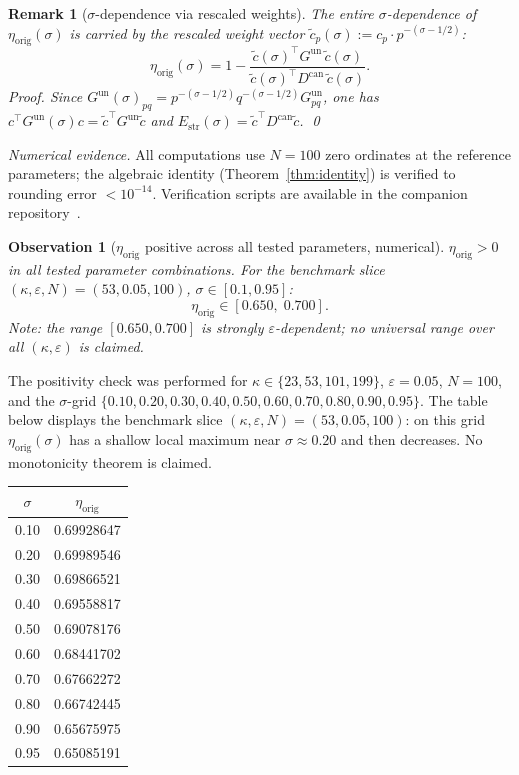 \documentclass[11pt]{article}
\newtheorem{observation}[theorem]{Observation}
\newtheorem*{remark}{Remark}
\newcommand{\Estr}{E_{\mathrm{str}}}
\newcommand{\etaorig}{\eta_{\mathrm{orig}}}
\newcommand{\Gun}{G^{\mathrm{un}}}
\newcommand{\Dcan}{D^{\mathrm{can}}}
\begin{document}
\begin{remark}[$\sigma$-dependence via rescaled weights]
The entire $\sigma$-dependence of $\etaorig(\sigma)$ is carried by the
rescaled weight vector $\tilde{c}_p(\sigma):=c_p\cdot p^{-(\sigma-1/2)}$:
\[
\etaorig(\sigma)=1-\frac{\tilde{c}(\sigma)^\top\Gun\,\tilde{c}(\sigma)}
{\tilde{c}(\sigma)^\top\Dcan\,\tilde{c}(\sigma)}.
\]
\emph{Proof.} Since $\Gun(\sigma)_{pq}=p^{-(\sigma-1/2)}q^{-(\sigma-1/2)}\Gun_{pq}$,
one has $c^\top\Gun(\sigma)c=\tilde{c}^\top\Gun\tilde{c}$ and
$\Estr(\sigma)=\tilde{c}^\top\Dcan\tilde{c}$. \qed
\end{remark}

\emph{Numerical evidence.}
All computations use $N=100$ zero ordinates at the reference
parameters; the algebraic identity (Theorem~\ref{thm:identity}) is
verified to rounding error $<10^{-14}$. Verification scripts are
available in the companion repository~\cite{Code}.

\begin{observation}[$\etaorig$ positive across all tested parameters, numerical]
$\etaorig>0$ in all tested parameter combinations. For the benchmark slice
$(\kappa,\varepsilon,N)=(53,0.05,100)$, $\sigma\in[0.1,0.95]$:
\[
\etaorig\in[0.650,\;0.700].
\]
Note: the range $[0.650,0.700]$ is strongly $\varepsilon$-dependent; no
universal range over all $(\kappa,\varepsilon)$ is claimed.
\end{observation}

The positivity check was performed for
$\kappa\in\{23,53,101,199\}$, $\varepsilon=0.05$, $N=100$,
and the $\sigma$-grid $\{0.10,0.20,0.30,0.40,0.50,0.60,0.70,0.80,0.90,0.95\}$.
The table below displays the benchmark slice
$(\kappa,\varepsilon,N)=(53,0.05,100)$: on this grid $\etaorig(\sigma)$ has
a shallow local maximum near $\sigma\approx0.20$ and then decreases.
No monotonicity theorem is claimed.

\begin{center}
\begin{tabular}{cc}
\toprule
$\sigma$ & $\etaorig$ \\
\midrule
0.10 & 0.69928647 \\
0.20 & 0.69989546 \\
0.30 & 0.69866521 \\
0.40 & 0.69558817 \\
0.50 & 0.69078176 \\
0.60 & 0.68441702 \\
0.70 & 0.67662272 \\
0.80 & 0.66742445 \\
0.90 & 0.65675975 \\
0.95 & 0.65085191 \\
\bottomrule
\end{tabular}
\end{center}
\end{document}
